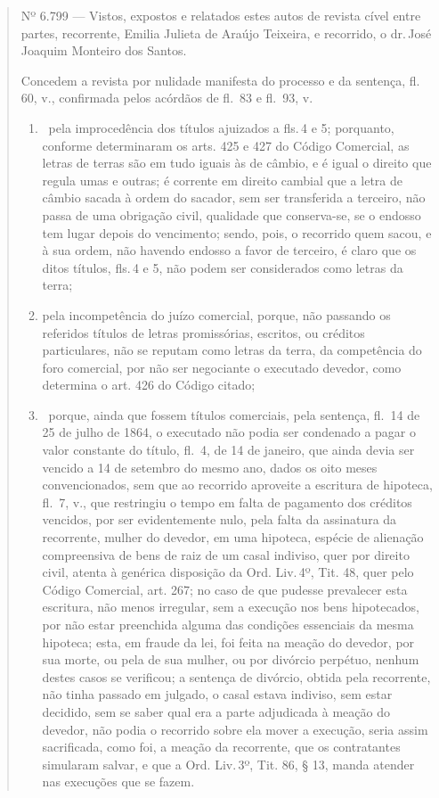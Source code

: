 \begin{quote}
Nº 6.799 --- Vistos, expostos e relatados estes autos de revista cível
entre partes, recorrente, Emilia Julieta de Araújo Teixeira, e
recorrido, o dr.\,José Joaquim Monteiro dos Santos.

Concedem a revista por nulidade manifesta do processo e da sentença, fl.
60, v., confirmada pelos acórdãos de fl.~83 e fl.~93, v.

\begin{enumerate}[label=\arabic*º:]
\item\ pela improcedência dos títulos ajuizados a fls.\,4 e 5; porquanto,
conforme determinaram os arts. 425 e 427 do Código Comercial, as letras
de terras são em tudo iguais às de câmbio, e é igual o direito que
regula umas e outras; é corrente em direito cambial que a letra de
câmbio sacada à ordem do sacador, sem ser transferida a terceiro, não
passa de uma obrigação civil, qualidade que conserva-se, se o endosso
tem lugar depois do vencimento; sendo, pois, o recorrido quem sacou, e à
sua ordem, não havendo endosso a favor de terceiro, é claro que os ditos
títulos, fls.\,4 e 5, não podem ser considerados como letras da terra;

\item pela incompetência do juízo comercial, porque, não passando os
referidos títulos de letras promissórias, escritos, ou créditos
particulares, não se reputam como letras da terra, da competência do
foro comercial, por não ser negociante o executado devedor, como
determina o art. 426 do Código citado;

\item\ porque, ainda que fossem títulos comerciais, pela sentença, fl.~14
de 25 de julho de 1864, o executado não podia ser condenado a pagar o
valor constante do título, fl.~4, de 14 de janeiro, que ainda devia ser
vencido a 14 de setembro do mesmo ano, dados os oito meses
convencionados, sem que ao recorrido aproveite a escritura de hipoteca,
fl.~7, v., que restringiu o tempo em falta de pagamento dos créditos
vencidos, por ser evidentemente nulo, pela falta da assinatura da
recorrente, mulher do devedor, em uma hipoteca, espécie de alienação
compreensiva de bens de raiz de um casal indiviso, quer por direito
civil, atenta à genérica disposição da Ord. Liv.\,4º, Tit. 48, quer pelo
Código Comercial, art. 267; no caso de que pudesse prevalecer esta
escritura, não menos irregular, sem a execução nos bens hipotecados, por
não estar preenchida alguma das condições essenciais da mesma hipoteca;
esta, em fraude da lei, foi feita na meação do devedor, por sua morte,
ou pela de sua mulher, ou por divórcio perpétuo, nenhum destes casos se
verificou; a sentença de divórcio, obtida pela recorrente, não tinha
passado em julgado, o casal estava indiviso, sem estar decidido, sem se
saber qual era a parte adjudicada à meação do devedor, não podia o
recorrido sobre ela mover a execução, seria assim sacrificada, como foi,
a meação da recorrente, que os contratantes simularam salvar, e que a
Ord. Liv.\,3º, Tit. 86, § 13, manda atender nas execuções que se fazem.
\end{enumerate}


\end{quote}
